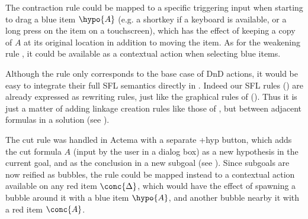 \begin{description}
    The contraction rule {} could be mapped to a specific triggering
    input when starting to drag a blue item $\hypo{A}$ (e.g. a shortkey if a
    keyboard is available, or a long press on the item on a touchscreen), which
    has the effect of keeping a copy of $A$ at its original location in addition
    to moving the item. As for the weakening rule
    {}, it could be available as a contextual action when selecting
    blue items.
  \item[\textbf{\identity}]
    Although the {} rule only corresponds to the base case
    of DnD actions, it would be easy to integrate their full SFL semantics
    directly in . Indeed our SFL rules () are already
    expressed as rewriting rules, just like the graphical rules of 
    (). Thus it is just a matter of adding linkage creation
    rules like those of , but between adjacent formulas
    in a solution (see ).

    The cut rule was handled in Actema with a separate \textsf{+hyp} button,
    which adds the cut formula $A$ (input by the user in a dialog box) as a new
    hypothesis in the current goal, and as the conclusion in a new subgoal (see
    ). Since subgoals are now reified as bubbles, the
    {} rule could be mapped instead to a contextual action
    available on any red item $\conc{\Delta}$, which would have the effect of
    spawning a bubble around it with a blue item $\hypo{A}$, and another bubble
    nearby it with a red item $\conc{A}$.


\end{description}
